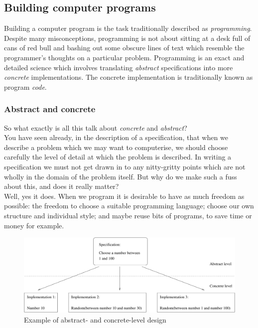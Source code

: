\subsection{Building computer programs}

Building a computer program is the task traditionally described
as {\em programming}. \\

\noindent
Despite many misconceptions, programming is not about sitting at a
desk full of cans of red bull and bashing out some obscure lines of text
which resemble the programmer's thoughts on a particular problem. Programming
is an exact and detailed science which involves translating {\em abstract} 
specifications
into more {\em concrete} implementations. The concrete implementation
is traditionally known as program {\em code}. 

\subsubsection{Abstract and concrete}

So what exactly is all this talk about {\em concrete} and {\em abstract}?\\

\noindent
You have seen already, in the description of a specification, that when we 
describe a problem which we may want to computerise, we should choose 
carefully the level of detail at which the problem is described. 
In writing a specification 
we must not get drawn in to any nitty-gritty points which are not
wholly in the domain of the problem itself. But why do we make such a
fuss about this, and does it really matter?\\

\noindent
Well, yes it does. When we program it is desirable to have as much freedom as 
possible: the freedom to choose a suitable programming language; choose 
our own structure and individual style; and maybe reuse bits of programs, 
to save time or money for example.  \\

\begin{figure}
\centering
\includegraphics[width=5in]{abstract.pdf}
  \caption{\small Example of abstract- and concrete-level design 
           \label{specimp}}
\end{figure}

